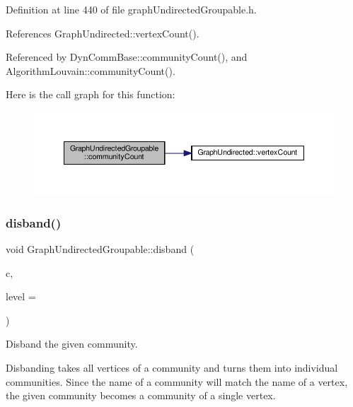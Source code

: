 Definition at line 440 of file graph\+Undirected\+Groupable.\+h.



References Graph\+Undirected\+::vertex\+Count().



Referenced by Dyn\+Comm\+Base\+::community\+Count(), and Algorithm\+Louvain\+::community\+Count().

Here is the call graph for this function\+:\nopagebreak
\begin{figure}[H]
\begin{center}
\leavevmode
\includegraphics[width=350pt]{classGraphUndirectedGroupable_adf6ebb83c3df6317f122a13650309ac4_cgraph}
\end{center}
\end{figure}
\mbox{\label{classGraphUndirectedGroupable_ac82f4c93994c372d05a660b36cdce8f3}} 
\subsubsection{\texorpdfstring{disband()}{disband()}}
{\footnotesize\ttfamily void Graph\+Undirected\+Groupable\+::disband (\begin{DoxyParamCaption}\item[{const \hyperlink{graphUndirectedGroupable_8h_a914da95c9ea7f14f4b7f875c36818556}{type\+Community} \&}]{c,  }\item[{const unsigned int \&}]{level = {} }\end{DoxyParamCaption})\hspace{0.3cm}{\ttfamily [inline]}}



Disband the given community. 

Disbanding takes all vertices of a community and turns them into individual communities. Since the name of a community will match the name of a vertex, the given community becomes a community of a single vertex.


